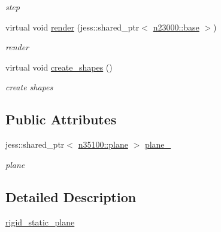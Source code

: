 \begin{DoxyCompactItemize}
\begin{DoxyCompactList}\small\item\em step \item\end{DoxyCompactList}\item 
virtual void \hyperlink{classnebula_1_1content_1_1actor_1_1admin_1_1rigid__static__plane_ac4b170a8bd046d8a9b8822cfd9ce89e5}{render} (jess::shared\_\-ptr$<$ \hyperlink{classnebula_1_1platform_1_1renderer_1_1base}{n23000::base} $>$)
\begin{DoxyCompactList}\small\item\em render \item\end{DoxyCompactList}\item 
virtual void \hyperlink{classnebula_1_1content_1_1actor_1_1admin_1_1rigid__static__plane_ad967d0a5cd7a1ee7864c28f6b73aff80}{create\_\-shapes} ()
\begin{DoxyCompactList}\small\item\em create shapes \item\end{DoxyCompactList}\end{DoxyCompactItemize}
\subsection*{Public Attributes}
\begin{DoxyCompactItemize}
\item 
jess::shared\_\-ptr$<$ \hyperlink{classnebula_1_1content_1_1shape_1_1admin_1_1plane}{n35100::plane} $>$ \hyperlink{classnebula_1_1content_1_1actor_1_1admin_1_1rigid__static__plane_a1768cc411027ded6e34fbddb97ee4e62}{plane\_\-}
\begin{DoxyCompactList}\small\item\em plane \item\end{DoxyCompactList}\end{DoxyCompactItemize}


\subsection{Detailed Description}
\hyperlink{classnebula_1_1content_1_1actor_1_1admin_1_1rigid__static__plane}{rigid\_\-static\_\-plane} 

